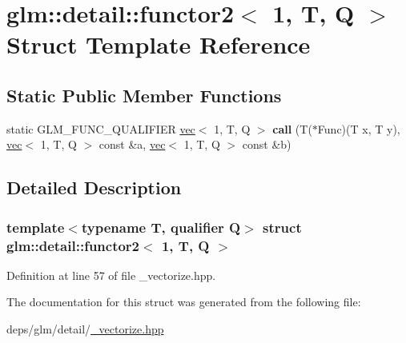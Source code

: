 \hypertarget{structglm_1_1detail_1_1functor2_3_011_00_01T_00_01Q_01_4}{}\section{glm\+:\+:detail\+:\+:functor2$<$ 1, T, Q $>$ Struct Template Reference}
\label{structglm_1_1detail_1_1functor2_3_011_00_01T_00_01Q_01_4}
\subsection*{Static Public Member Functions}
\begin{DoxyCompactItemize}
\item 
\mbox{\label{structglm_1_1detail_1_1functor2_3_011_00_01T_00_01Q_01_4_a0b888a7ffd7160ff96736ecad347708c}} 
static G\+L\+M\+\_\+\+F\+U\+N\+C\+\_\+\+Q\+U\+A\+L\+I\+F\+I\+ER \hyperlink{structglm_1_1vec}{vec}$<$ 1, T, Q $>$ {\bfseries call} (T($\ast$Func)(T x, T y), \hyperlink{structglm_1_1vec}{vec}$<$ 1, T, Q $>$ const \&a, \hyperlink{structglm_1_1vec}{vec}$<$ 1, T, Q $>$ const \&b)
\end{DoxyCompactItemize}


\subsection{Detailed Description}
\subsubsection*{template$<$typename T, qualifier Q$>$\newline
struct glm\+::detail\+::functor2$<$ 1, T, Q $>$}



Definition at line 57 of file \+\_\+vectorize.\+hpp.



The documentation for this struct was generated from the following file\+:\begin{DoxyCompactItemize}
\item 
deps/glm/detail/\hyperlink{__vectorize_8hpp}{\+\_\+vectorize.\+hpp}\end{DoxyCompactItemize}
